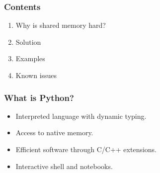 \documentclass[%
]{beamer}
\begin{document}
\begin{frame}
\begin{tikzpicture}[x=\textwidth, y=\textheight]
        
    \end{tikzpicture}


\end{frame}

\begin{frame}
    \frametitle{Contents}
    \begin{enumerate}
          \item Why is shared memory hard?
          \item Solution
          \item Examples
          \item Known issues
    \end{enumerate}
\end{frame}

\begin{frame}
    \frametitle{What is Python?}
    \begin{itemize}
          \item<1-> Interpreted language with dynamic typing.
          \item<2-> Access to native memory.
          \item<3-> Efficient software through C/C++ extensions.
          \item<4-> Interactive shell and notebooks.
    \end{itemize}
\end{frame}
\end{document}
